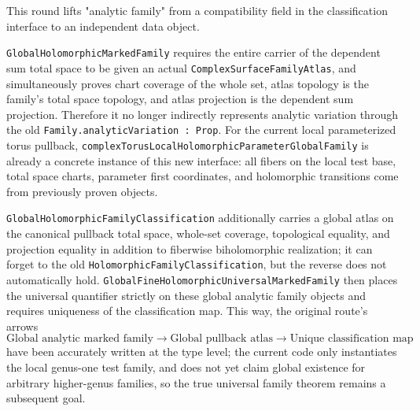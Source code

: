 \documentclass[UTF8,a4paper,11pt]{article}
\begin{document}
This round lifts "analytic family" from a compatibility field in the classification interface to an independent data object.
\par
\texttt{Global\allowbreak Holomorphic\allowbreak Marked\allowbreak Family} requires the entire carrier of the dependent sum total space to be given an actual
\texttt{ComplexSurfaceFamily\allowbreak Atlas}, and simultaneously proves chart coverage of the whole set, atlas topology is the family's total space topology, and atlas projection is the dependent sum projection. Therefore it no longer indirectly represents analytic variation through the old
\texttt{Family.analyticVariation : Prop}. For the current local parameterized torus pullback,
\texttt{complexTorusLocalHolomorphicParameter\allowbreak Global\allowbreak Family} is already a concrete instance of this new interface:
all fibers on the local test base, total space charts, parameter first coordinates, and holomorphic transitions come from previously proven objects.

\texttt{GlobalHolomorphic\allowbreak Family\allowbreak Classification} additionally carries
a global atlas on the canonical pullback total space, whole-set coverage, topological equality, and projection equality in addition to fiberwise biholomorphic realization; it can forget to the old
\texttt{HolomorphicFamily\allowbreak Classification}, but the reverse does not automatically hold. \texttt{GlobalFineHolomorphicUniversal\allowbreak Marked\allowbreak Family} then places the universal quantifier strictly on these global analytic family objects and requires uniqueness of the classification map. This way, the original route's arrows
\[
  \text{Global analytic marked family}\longrightarrow\text{Global pullback atlas}\longrightarrow\text{Unique classification map}
\]
have been accurately written at the type level; the current code only instantiates the local genus-one test family, and does not yet claim global existence for arbitrary higher-genus families, so the true universal family theorem remains a subsequent goal.
\end{document}

